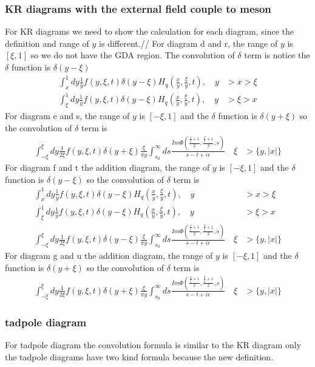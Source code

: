 \documentclass[preprintnumbers,prd,superscriptaddress,preprint]{revtex4-1}
\begin{document}
	\subsubsection{KR diagrams with the external field couple to meson}
	For KR diagrams we need to show the calculation for each diagram, since the definition and range of $y$ is different.//
	For diagram d and r, the range of $y$ is $[\xi,1]$ so we do not have the GDA region. The convolution of $\delta$ term is notice  the $\delta$ function is $\delta(y-\xi)$
	\begin{align*}
		\int_{x}^{1}dy\frac{1}{y}f(y,\xi,t)\delta(y-\xi)H_{q}(\frac{x}{y},\frac{\xi}{y},t),\quad y & >x>\xi\\
		\int_{\xi}^{1}dy\frac{1}{y}f(y,\xi,t)\delta(y-\xi)H_{q}(\frac{x}{y},\frac{\xi}{y},t),\quad y & >\xi>x
	\end{align*}
	For diagram e and s, the range of  $y$ is $[-\xi,1]$ and the $\delta$ function is $\delta(y+\xi)$ so the convolution of $\delta$ term is 
	\begin{align*}
		\int_{-\xi}^{\xi}dy\frac{1}{2\xi}f(y,\xi,t)\delta(y+\xi)\frac{\xi}{\pi y}\int_{s_{0}}^{\infty}ds\frac{Im\Phi(\frac{\frac{x}{\xi}+1}{2},\frac{\frac{y}{\xi}+1}{2},s)}{s-t+i\epsilon}\quad\xi & >\{y,|x|\}
	\end{align*}
	For diagram f and t the addition diagram, the range of  $y$ is $[-\xi,1]$ and the $\delta$ function is $\delta(y-\xi)$ so the convolution of $\delta$ term is 
	\begin{align*}
		\int_{x}^{1}dy\frac{1}{y}f(y,\xi,t)\delta(y-\xi)H_{q}(\frac{x}{y},\frac{\xi}{y},t),\quad y & >x>\xi\\
		\int_{\xi}^{1}dy\frac{1}{y}f(y,\xi,t)\delta(y-\xi)H_{q}(\frac{x}{y},\frac{\xi}{y},t),\quad y & >\xi>x\\
		\int_{-\xi}^{\xi}dy\frac{1}{2\xi}f(y,\xi,t)\delta(y-\xi)\frac{\xi}{\pi y}\int_{s_{0}}^{\infty}ds\frac{Im\Phi(\frac{\frac{x}{\xi}+1}{2},\frac{\frac{y}{\xi}+1}{2},s)}{s-t+i\epsilon}\quad\xi & >\{y,|x|\}
	\end{align*}
	For diagram g and u the addition diagram, the range of  $y$ is $[-\xi,1]$ and the $\delta$ function is $\delta(y+\xi)$ so the convolution of $\delta$ term is 
	\begin{align*}
		\int_{-\xi}^{\xi}dy\frac{1}{2\xi}f(y,\xi,t)\delta(y+\xi)\frac{\xi}{\pi y}\int_{s_{0}}^{\infty}ds\frac{Im\Phi(\frac{\frac{x}{\xi}+1}{2},\frac{\frac{y}{\xi}+1}{2},s)}{s-t+i\epsilon}\quad\xi & >\{y,|x|\}
	\end{align*}
	\subsubsection{tadpole diagram}
	For tadpole diagram the convolution formula is similar to the KR diagram only the tadpole diagrams have two kind formula because the new definition.
	
\end{document}
